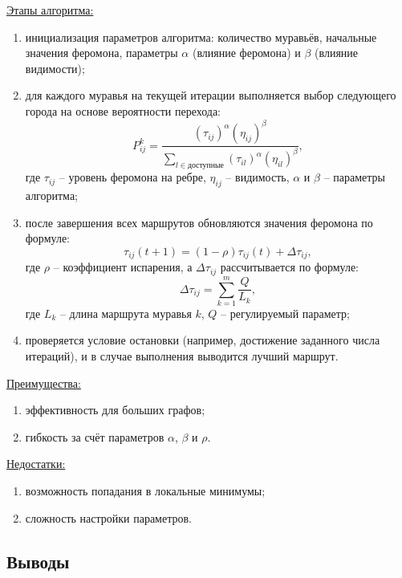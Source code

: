 \underline{Этапы алгоритма:}
\begin{enumerate}[label=\arabic*)]
    \item инициализация параметров алгоритма: количество муравьёв, начальные значения феромона, параметры $\alpha$ (влияние феромона) и $\beta$ (влияние видимости);
    \item для каждого муравья на текущей итерации выполняется выбор следующего города на основе вероятности перехода:
    \begin{equation*}
    P_{ij}^k = \frac{(\tau_{ij})^\alpha (\eta_{ij})^\beta}{\sum_{l \in \text{доступные}} (\tau_{il})^\alpha (\eta_{il})^\beta},
    \end{equation*}
    где $\tau_{ij}$ -- уровень феромона на ребре, $\eta_{ij}$ -- видимость, $\alpha$ и $\beta$ -- параметры алгоритма;
    \item после завершения всех маршрутов обновляются значения феромона по формуле:
    \begin{equation*}
    \tau_{ij}(t+1) = (1 - \rho) \tau_{ij}(t) + \Delta \tau_{ij},
    \end{equation*}
    где $\rho$ -- коэффициент испарения, а $\Delta \tau_{ij}$ рассчитывается по формуле:
    \begin{equation*}
    \Delta \tau_{ij} = \sum_{k=1}^{m} \frac{Q}{L_k},
    \end{equation*}
    где $L_k$ -- длина маршрута муравья $k$, $Q$ -- регулируемый параметр;
    \item проверяется условие остановки (например, достижение заданного числа итераций), и в случае выполнения выводится лучший маршрут.
\end{enumerate}

\underline{Преимущества:}
\begin{enumerate}[label=\arabic*)]
    \item эффективность для больших графов;
    \item гибкость за счёт параметров $\alpha$, $\beta$ и $\rho$.
\end{enumerate}

\underline{Недостатки:}
\begin{enumerate}[label=\arabic*)]
    \item возможность попадания в локальные минимумы;
    \item сложность настройки параметров.~\cite{bachelor_tsp}
\end{enumerate}


\subsection{Выводы}

